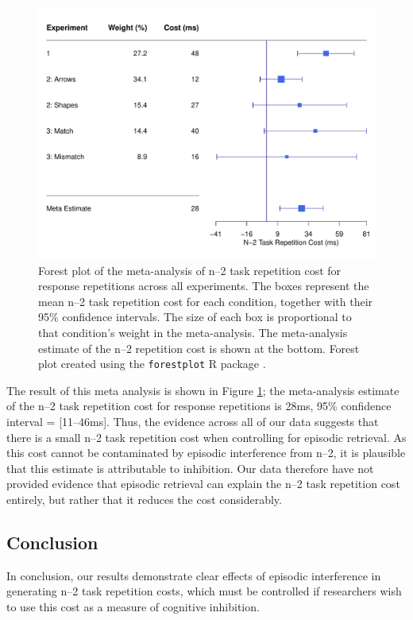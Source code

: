 \documentclass[a4paper, doc, natbib]{apa6}
\begin{document}
\begin{figure}
\begin{center}
\includegraphics[width = \textwidth]{Images/meta_analysis.pdf}
\caption{Forest plot of the meta-analysis of n--2 task repetition cost for response repetitions across all experiments. The boxes represent the mean n--2 task repetition cost for each condition, together with their 95\% confidence intervals. The size of each box is proportional to that condition's weight in the meta-analysis. The meta-analysis estimate of the n--2 repetition cost is shown at the bottom. Forest plot created using the \texttt{forestplot} R package \citep{Gordon2016}.}
\label{fig:meta_analysis}
\end{center}
\end{figure}

The result of this meta analysis is shown in Figure \ref{fig:meta_analysis}; the meta-analysis estimate of the n--2 task repetition cost for response repetitions is 28ms, 95\% confidence interval = [11--46ms]. Thus, the evidence across all of our data suggests that there is a small n--2 task repetition cost when controlling for episodic retrieval. As this cost cannot be contaminated by episodic interference from n--2, it is plausible that this estimate is attributable to inhibition. Our data therefore have not provided evidence that episodic retrieval can explain the n--2 task repetition cost entirely, but rather that it reduces the cost considerably. 

\subsection{Conclusion}
In conclusion, our results demonstrate clear effects of episodic interference in generating n--2 task repetition costs, which must be controlled if researchers wish to use this cost as a measure of cognitive inhibition. 
\end{document}
